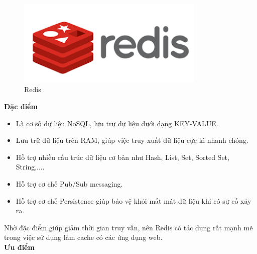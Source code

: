             \begin{figure}[H]   			
            	\includegraphics[width=0.8\textwidth]{Images/redis.png}
            	\centering
            	\linebreak
            	\caption{Redis\cite{Redis}} 
            \end{figure}
            
            
            \textbf{Đặc điểm}
            
            \begin{itemize}
                \item Là cơ sở dữ liệu NoSQL, lưu trữ dữ liệu dưới dạng KEY-VALUE.
                \item Lưu trữ dữ liệu trên RAM, giúp việc truy xuất dữ liệu cực kì nhanh chóng.
                \item Hỗ trợ nhiều cấu trúc dữ liệu cơ bản như Hash, List, Set, Sorted Set, String,....
                \item Hỗ trợ cơ chế Pub/Sub messaging.
                \item Hỗ trợ cơ chế Persistence giúp bảo vệ khỏi mất mát dữ liệu khi có sự cố xảy ra.
            \end{itemize}
            
            Nhờ đặc điểm giúp giảm thời gian truy vấn, nên Redis có tác dụng rất mạnh mẽ trong việc sử dụng làm cache có các ứng dụng web.\\ 
            
            \textbf{Ưu điểm}
            
